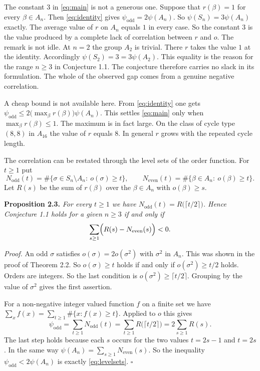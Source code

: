 \documentclass[10pt]{article}
\begin{document}
The constant $3$ in \eqref{eq:main} is not a generous one. Suppose that $r(\beta)=1$ for
every $\beta\in A_n$. Then \eqref{eq:identity} gives $\psi_{\mathrm{odd}}=2\psi(A_n)$. So
$\psi(S_n)=3\psi(A_n)$ exactly. The average value of $r$ on $A_n$ equals $1$ in every case.
So the constant $3$ is the value produced by a complete lack of correlation between $r$ and
$o$. The remark is not idle. At $n=2$ the group $A_2$ is trivial. There $r$ takes the value
$1$ at the identity. Accordingly $\psi(S_2)=3=3\psi(A_2)$. This equality is the reason for
the range $n\ge3$ in Conjecture 1.1. The conjecture therefore carries no slack in its
formulation. The whole of the observed gap comes from a genuine negative correlation.

A cheap bound is not available here. From \eqref{eq:identity} one gets
$\psi_{\mathrm{odd}}\le2\bigl(\max_{\beta}r(\beta)\bigr)\psi(A_n)$. This settles
\eqref{eq:main} only when $\max_\beta r(\beta)\le1$. The maximum is in fact large. On the
class of cycle type $(8,8)$ in $A_{16}$ the value of $r$ equals $8$. In general $r$ grows
with the repeated cycle length.

The correlation can be restated through the level sets of the order function. For $t\ge1$
put
\[
  N_{\mathrm{odd}}(t)=\#\{\sigma\in S_n\setminus A_n:\ o(\sigma)\ge t\},\qquad
  N_{\mathrm{even}}(t)=\#\{\beta\in A_n:\ o(\beta)\ge t\}.
\]
Let $R(s)$ be the sum of $r(\beta)$ over the $\beta\in A_n$ with $o(\beta)\ge s$.

\medskip\noindent
\textbf{Proposition 2.3.} \emph{For every $t\ge1$ we have
$N_{\mathrm{odd}}(t)=R\bigl(\lceil t/2\rceil\bigr)$. Hence Conjecture 1.1 holds for a given
$n\ge3$ if and only if}
\begin{equation}\label{eq:levelsets}
  \sum_{s\ge1}\Bigl(R(s)-N_{\mathrm{even}}(s)\Bigr)<0 .
\end{equation}

\medskip\noindent
\textit{Proof.} An odd $\sigma$ satisfies $o(\sigma)=2o(\sigma^{2})$ with $\sigma^{2}$ in
$A_n$. This was shown in the proof of Theorem 2.2. So $o(\sigma)\ge t$ holds if and only if
$o(\sigma^{2})\ge t/2$ holds. Orders are integers. So the last condition is
$o(\sigma^{2})\ge\lceil t/2\rceil$. Grouping by the value of $\sigma^{2}$ gives the first
assertion.

For a non-negative integer valued function $f$ on a finite set we have
$\sum_{x}f(x)=\sum_{t\ge1}\#\{x:f(x)\ge t\}$. Applied to $o$ this gives
\[
  \psi_{\mathrm{odd}}=\sum_{t\ge1}N_{\mathrm{odd}}(t)=\sum_{t\ge1}R\bigl(\lceil t/2\rceil\bigr)
  =2\sum_{s\ge1}R(s).
\]
The last step holds because each $s$ occurs for the two values $t=2s-1$ and $t=2s$. In the
same way $\psi(A_n)=\sum_{s\ge1}N_{\mathrm{even}}(s)$. So the inequality
$\psi_{\mathrm{odd}}<2\psi(A_n)$ is exactly \eqref{eq:levelsets}. $\square$
\end{document}
